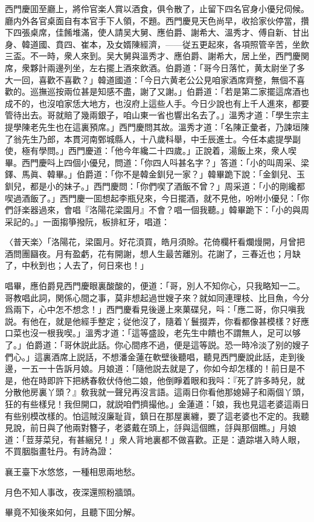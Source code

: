 西門慶囬至廳上，將伶官楽人賞以酒食，俱令散了，止留下四名官身小優兒伺候。廳内外各官桌面自有本官手下人領，不題。西門慶見天色尚早，收拾家伙停當，攢下四張桌席，佳餚堆滿，使人請吴大舅、應伯爵、謝希大、溫秀才、傅自新、甘出身、韓道國、賁四、崔本，及女婿陳經濟，——従五更起來，各項照管辛苦，坐飲三盃。不一時，衆人來到。吴大舅與溫秀才、應伯爵、謝希大，居上坐，西門慶関席，衆夥計兩邊列坐，左右擺上酒來飲酒。伯爵道：「哥今日落忙，黄太尉坐了多大一回，喜歡不喜歡？」韓道國道：「今日六黄老公公見咱家酒席齊整，無個不喜歡的。巡撫巡按兩位甚是知感不盡，謝了又謝。」伯爵道：「若是第二家擺這席酒也成不的，也沒咱家恁大地方，也沒府上這些人手。今日少說也有上千人進來，都要管待出去。哥就賠了幾兩銀子，咱山東一省也響出名去了。」溫秀才道：「學生宗主提學陳老先生也在這裏預席。」西門慶問其故。溫秀才道：「名陳正彙者，乃諫垣陳了翁先生乃郎，本貫河南鄄城縣人，十八歲科舉，中壬辰進士。今任本處提學副使，極有學問。」西門慶道：「他今年纔二十四歲。」正說着，湯飯上來，衆人喫畢。西門慶呌上四個小優兒，問道：「你四人呌甚名字？」答道：「小的叫周采、梁鐸、馬眞、韓畢。」伯爵道：「你不是韓金釧兒一家？」韓畢跪下說：「金釧兒、玉釧兒，都是小的妹子。」西門慶問：「你們喫了酒飯不曾？」周采道：「小的剛纔都喫過酒飯了。」西門慶一囬想起李瓶兒來，今日擺酒，就不見他，吩咐小優兒：「你們㧱楽器過來，會唱『洛陽花梁園月』不會？唱一個我聽。」韓畢跪下：「小的與周采記的。」一面搊箏撥阮，板排紅牙，唱道：

\begin{myquote}
{\markfont〈普天楽〉}「洛陽花，梁園月。好花湏買，皓月須賒。花倚欄杆看爛熳開，月曾把酒問團圝夜。月有盈虧，花有開謝，想人生最苦離別。花謝了，三春近也；月缺了，中秋到也；人去了，何日來也！」
\end{myquote}

唱畢，應伯爵見西門慶眼裏酸酸的，便道：「哥，別人不知你心，只我略知一二。哥教唱此詞，関係心間之事，莫非想起過世嫂子來？就如同連理枝、比目魚，今分爲兩下，心中怎不想念！」西門慶看見後邊上來菓碟兒，呌：「應二哥，你只嗔我説。有他在，就是他經手整定；従他沒了，隨着丫鬟掇弄，你看都像甚模樣？好應口菜也沒一根我喫。」溫秀才道：「這等盛設，老先生中饋也不謂無人，足可以够了。」伯爵道：「哥休説此話。你心間疼不過，便是這等説。恐一時冷淡了别的嫂子們心。」這裏酒席上説話，不想潘金蓮在軟壁後聽唱，聽見西門慶說此話，走到後邊，一五一十告訴月娘。月娘道：「隨他説去就是了，你如今却怎樣的！前日是不是，他在時即許下把綉春敎伏侍他二娘，他倒睜着眼和我呌：『死了許多時兒，就分散他房裏丫頭？』敎我就一聲兒再沒言語。這兩日你看他那媳婦子和兩個丫頭，狂的有些樣兒！我但開口，就説咱們擠撮他。」金蓮道：「娘，我也見這老婆這兩日有些别模改樣的。怕這賊沒廉耻貨，鎮日在那屋裏纏，要了這老婆也不定的。我聽見說，前日與了他兩對簪子，老婆戴在頭上，㧱與這個瞧，㧱與那個瞧。」月娘道：「荳芽菜兒，有甚綑兒！」衆人背地裏都不做喜歡。正是：遺踪堪入時人眼，不買胭脂畫牡丹。有詩為證：

\begin{myquote}
襄王臺下水悠悠，一種相思兩地愁。

月色不知人事改，夜深還照粉牆頭。
\end{myquote}

畢竟不知後來如何，且聽下囬分解。

